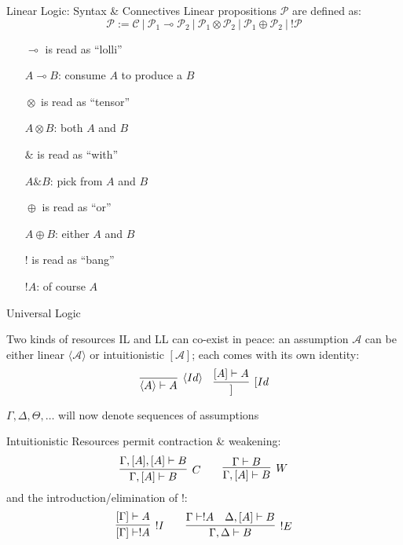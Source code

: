 \documentclass{beamer}
\newcommand{\li}{\!\multimap\!}
\newcommand{\lotimes}{\!\otimes\!}
\newcommand{\loplus}{\!\oplus\!}
\newcommand{\lin}[1]{\langle#1\rangle}
\newcommand{\lint}[1]{[#1]}
\begin{document}
\begin{frame}{Linear Logic: Syntax \& Connectives}
		Linear propositions $\mathcal{P}$ are defined as:
		\[
		\mathcal{P} := \mathcal{C}  \ | \ \mathcal{P}_1 \li \mathcal{P}_2 \ | \ \mathcal{P}_1 \lotimes \mathcal{P}_2 \
		| \ \mathcal{P}_1 \loplus \mathcal{P}_2 \ | \ !\mathcal{P}
		\]
	\vfill
	

	\begin{itemize}
		\item[$\li$] is read as ``lolli'' \\
			\begin{flushright}
			\small{$A\li B$: consume $A$ to produce a $B$}
			\end{flushright}		
		\item[$\lotimes$] is read as ``tensor''
			\begin{flushright}
			\small{$A\lotimes B$: both $A$ and $B$}
			\end{flushright}		
		\item[$\&$] is read as ``with''
			\begin{flushright}
			\small{$A\& B$: pick from $A$ and $B$}
			\end{flushright}
		\item[$\loplus$] is read as ``or''
			\begin{flushright}
			\small{$A\loplus B$: either $A$ and $B$}
			\end{flushright}
		\item[$!$] is read as ``bang''
			\begin{flushright}
			\small{$!A$: of course $A$}
			\end{flushright}
	\end{itemize}
\end{frame}

\begin{frame}{Universal Logic}
	\small	
	
	\begin{block}{Two kinds of resources}
		IL and LL can co-exist in peace:
		an \alert{assumption} $\mathcal{A}$ can be either \alert{linear} $\lin{\mathcal{A}}$ or \alert{intuitionistic} $\lint{\mathcal{A}}$; each comes with its own identity:
		\[
		\vcenter{\infer[\lin{Id}]{\lin{A} \vdash A}{}}  \quad \vcenter{\infer[\lint{Id}]{\lint{A} \vdash A}{}}
		\]
		\begin{flushright}
			$\Gamma, \Delta, \Theta, \dots$ will now denote \alert{sequences of assumptions}
		\end{flushright}
	\end{block}
	\pause
	
	\begin{block}{Intuitionistic Resources}
		permit contraction \& weakening:
		\[
			\vcenter{\infer[C]{\Gamma, \lint{A} \vdash B}{\Gamma, \lint{A}, \lint{A} \vdash B}}
			\quad\quad
			\vcenter{\infer[W]{\Gamma, \lint{A} \vdash B}{\Gamma \vdash B}}
		\]
		\pause
		and the introduction/elimination of !:
		\[
			\vcenter{\infer[!I]{\lint{\Gamma} \vdash !A}{\lint{\Gamma} \vdash A}}
			\quad\quad
			\vcenter{\infer[!E]{\Gamma, \Delta \vdash B}{
				\Gamma \vdash !A
				&
				\Delta, \lint{A} \vdash B
			}
			}
		\]
	\end{block}
\end{frame}
\end{document}
